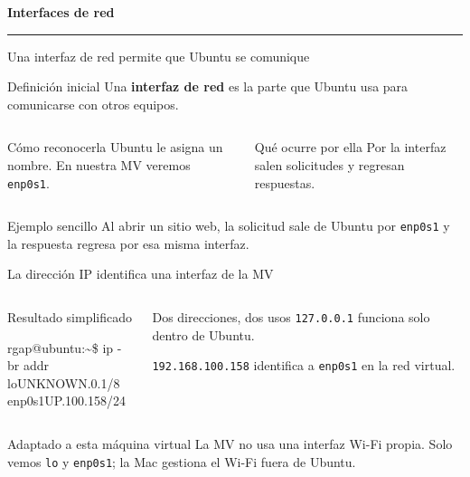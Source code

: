 \documentclass[aspectratio=169,10pt,c]{beamer}
\begin{document}
\begin{frame}[plain]
\vfill
\begin{center}
{\fontsize{29}{34}\selectfont\bfseries Interfaces de red}\par
\vspace{4mm}
{\color{utpRojo}\rule{8.5cm}{1.2pt}}
\end{center}
\vfill
\end{frame}

\begin{frame}{Una interfaz de red permite que Ubuntu se comunique}
\begin{block}{Definición inicial}
\small Una \textbf{interfaz de red} es la parte que Ubuntu usa para comunicarse con otros equipos.
\end{block}
\begin{columns}[T,onlytextwidth]
\begin{exampleblock}{Cómo reconocerla}
\small Ubuntu le asigna un nombre. En nuestra MV veremos \texttt{enp0s1}.
\end{exampleblock}
\begin{exampleblock}{Qué ocurre por ella}
\small Por la interfaz salen solicitudes y regresan respuestas.
\end{exampleblock}
\end{columns}
\begin{alertblock}{Ejemplo sencillo}
\small Al abrir un sitio web, la solicitud sale de Ubuntu por \texttt{enp0s1} y la respuesta regresa por esa misma interfaz.
\end{alertblock}
\end{frame}

\begin{frame}{La dirección IP identifica una interfaz de la MV}
\begin{columns}[T,onlytextwidth]
\begin{exampleblock}{Resultado simplificado}
\begin{terminal}
rgap@ubuntu:\textasciitilde\$ ip -br addr\\
lo\quad UNKNOWN.0.1/8\\
enp0s1\quad UP.100.158/24
\end{terminal}
\end{exampleblock}
\begin{block}{Dos direcciones, dos usos}
\small
\texttt{127.0.0.1} funciona solo dentro de Ubuntu.\par\medskip
\texttt{192.168.100.158} identifica a \texttt{enp0s1} en la red virtual.
\end{block}
\end{columns}
\begin{alertblock}{Adaptado a esta máquina virtual}
\small La MV no usa una interfaz Wi-Fi propia. Solo vemos \texttt{lo} y \texttt{enp0s1}; la Mac gestiona el Wi-Fi fuera de Ubuntu.
\end{alertblock}
\end{frame}
\end{document}

